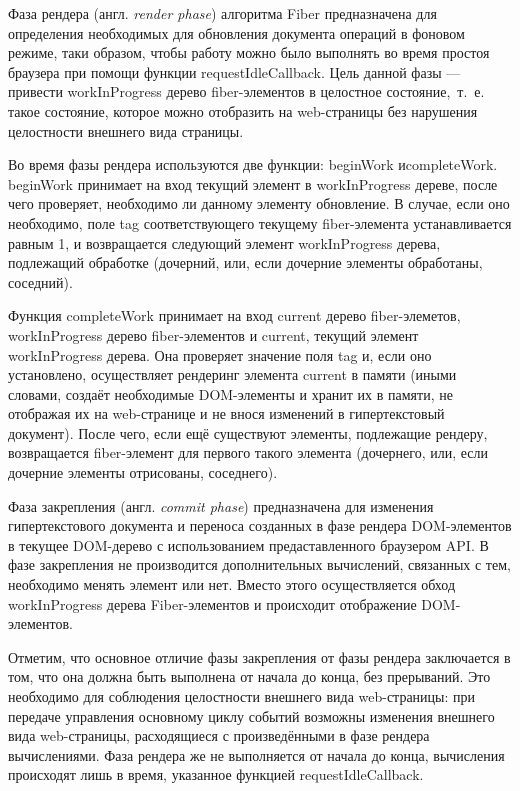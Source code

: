 Фаза рендера (англ. \textit{render phase}) алгоритма Fiber предназначена для определения необходимых для обновления документа операций в фоновом режиме, таки образом, чтобы работу можно было выполнять во время простоя браузера при помощи функции requestIdleCallback. Цель данной фазы --- привести workInProgress дерево fiber-элементов в целостное состояние,~т.~е. такое состояние, которое можно отобразить на web-страницы без нарушения целостности внешнего вида страницы.

Во время фазы рендера используются две функции: beginWork и\linebreak completeWork. beginWork принимает на вход текущий элемент в workInProgress дереве, после чего проверяет, необходимо ли данному элементу обновление. В случае, если оно необходимо, поле tag соответствующего текущему fiber-элемента устанавливается равным 1, и возвращается следующий элемент \linebreak workInProgress дерева, подлежащий обработке (дочерний, или, если дочерние элементы обработаны, соседний).

Функция completeWork принимает на вход current дерево fiber-элеметов, workInProgress дерево fiber-элементов и current, текущий элемент workInProgress дерева. Она проверяет значение поля tag и, если оно установлено, осуществляет рендеринг элемента current в памяти (иными словами, создаёт необходимые DOM-элементы и хранит их в памяти, не отображая их на web-странице и не внося изменений в гипертекстовый документ). После чего, если ещё существуют элементы, подлежащие рендеру, возвращается fiber-элемент для первого такого элемента (дочернего, или, если дочерние элементы отрисованы, соседнего).


Фаза закрепления (англ. \textit{commit phase}) предназначена для изменения гипертекстового документа и переноса созданных в фазе рендера DOM-элементов в текущее DOM-дерево с использованием предаставленного браузером API.
В фазе закрепления не производится дополнительных вычислений, связанных с тем, необходимо менять элемент или нет.
Вместо этого осуществляется обход workInProgress дерева Fiber-элементов и происходит отображение DOM-элементов.

Отметим, что основное отличие фазы закрепления от фазы рендера заключается в том, что она должна быть выполнена от начала до конца, без прерываний. Это необходимо для соблюдения целостности внешнего вида web-страницы: при передаче управления основному циклу событий возможны изменения внешнего вида web-страницы, расходящиеся с произведёнными в фазе рендера вычислениями. Фаза рендера же не выполняется от начала до конца, вычисления происходят лишь в время, указанное функцией requestIdleCallback.

